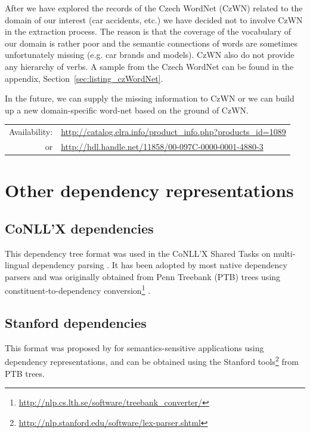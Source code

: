 After we have explored the records of the Czech WordNet (CzWN) related to the domain of our interest (car accidents, etc.) we have decided not to involve CzWN in the extraction process. The reason is that the coverage of the vocabulary of our domain is rather poor and the semantic connections of words are sometimes unfortunately missing (e.g. car brands and models). CzWN also do not provide any hierarchy of verbs. A sample from the Czech WordNet can be found in the appendix, Section~\ref{sec:listing_czWordNet}. 

In the future, we can supply the missing information to CzWN or we can build up a new domain-specific word-net based on the ground of CzWN.  

\medskip
\begin{center}
\begin{tabular}{rl}
Availability:&\url{http://catalog.elra.info/product_info.php?products_id=1089}\\
or & \url{http://hdl.handle.net/11858/00-097C-0000-0001-4880-3}\\
\end{tabular}
\end{center}


\section{Other dependency representations} 
\subsection{CoNLL’X dependencies} 
This dependency
tree format was used in the CoNLL’X
Shared Tasks on multi-lingual dependency
parsing \citep{Buchholz2006CoNLLX}. It has been adopted
by most native dependency parsers and was
originally obtained from Penn Treebank (PTB)
trees using constituent-to-dependency conversion\footnote{\url{http://nlp.cs.lth.se/software/treebank_converter/}} \citep{johansson2007a}.


\subsection{Stanford dependencies}

This format was
proposed by \cite{stanfordDeps} for
semantics-sensitive applications using dependency
representations, and can be obtained using
the Stanford tools\footnote{\url{http://nlp.stanford.edu/software/lex-parser.shtml}} from PTB trees. 






